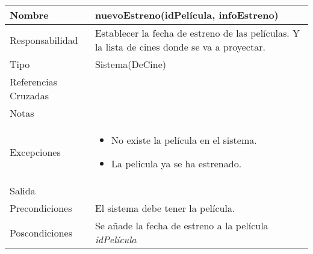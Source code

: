 \documentclass{article}
\begin{document}
\begin{table}[h]
\begin{tabular}{|l|l|l|l|l|l|}
\hline
\multicolumn{2}{|p{3cm}|}{Nombre} & \multicolumn{4}{p{10cm}|}{\textbf{nuevoEstreno(idPelícula, infoEstreno)}}\\
\hline
\multicolumn{2}{|p{3cm}|}{Responsabilidad} & \multicolumn{4}{p{10cm}|}{Establecer la fecha de estreno de las películas. Y la lista de cines donde se va a proyectar.} \\
\hline
\multicolumn{2}{|p{3cm}|}{Tipo} & \multicolumn{4}{p{10cm}|}{Sistema(DeCine)} \\
\hline
\multicolumn{2}{|p{3cm}|}{Referencias Cruzadas} & \multicolumn{4}{p{10cm}|}{} \\
\hline
\multicolumn{2}{|p{3cm}|}{Notas} & \multicolumn{4}{p{10cm}|}{} \\
\hline
\multicolumn{2}{|p{3cm}|}{Excepciones} & \multicolumn{4}{p{10cm}|}{\begin{itemize}
\item No existe la película en el sistema.
\item La pelicula ya se ha estrenado.
\end{itemize}} \\
\hline
\multicolumn{2}{|p{3cm}|}{Salida} & \multicolumn{4}{p{10cm}|}{} \\
\hline
\multicolumn{2}{|p{3cm}|}{Precondiciones} & \multicolumn{4}{p{10cm}|}{El sistema debe tener la película.} \\
\hline
\multicolumn{2}{|p{3cm}|}{Poscondiciones} & \multicolumn{4}{p{10cm}|}{Se añade la fecha de estreno a la película \textit{idPelícula}} \\
\hline
\end{tabular}
\end{table}
\end{document}
